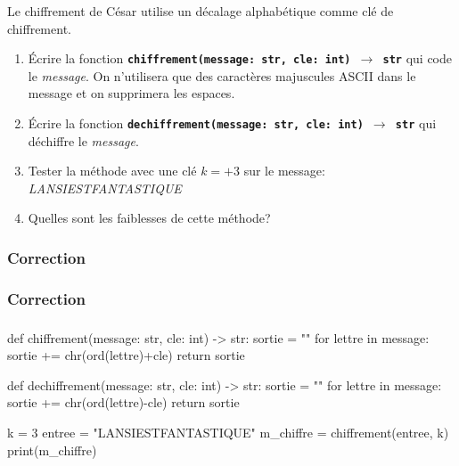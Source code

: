 \documentclass[svgnames,11pt]{beamer}
\begin{document}
\begin{frame}
    \frametitle{}

    \begin{activite}
    Le chiffrement de César utilise un décalage alphabétique comme clé de chiffrement.
    \begin{enumerate}
        \item Écrire la fonction \textbf{\texttt{chiffrement(message: str, cle: int) $\rightarrow$ str}} qui code le \emph{message}. On n'utilisera que des caractères majuscules ASCII dans le message et on supprimera les espaces.
        \item Écrire la fonction \textbf{\texttt{dechiffrement(message: str, cle: int) $\rightarrow$ str}} qui déchiffre le \emph{message}.
        \item Tester la méthode avec une clé $k=+3$ sur le message: \emph{LANSIESTFANTASTIQUE}
        \item Quelles sont les faiblesses de cette méthode?
    \end{enumerate}
    \end{activite}

\end{frame}
\begin{frame}
    \frametitle{Correction}



\end{frame}
\begin{frame}
    \frametitle{Correction}



\end{frame}
\begin{frame}[fragile]
    \frametitle{}
    

    \begin{pycode}
def chiffrement(message: str, cle: int) -> str:
    sortie = ""
    for lettre in message:
        sortie += chr(ord(lettre)+cle)
    return sortie


def dechiffrement(message: str, cle: int) -> str:
    sortie = ""
    for lettre in message:
        sortie += chr(ord(lettre)-cle)
    return sortie


k = 3
entree = "LANSIESTFANTASTIQUE"
m_chiffre = chiffrement(entree, k)
print(m_chiffre)
    \end{pycode}

\end{frame}
\end{document}
